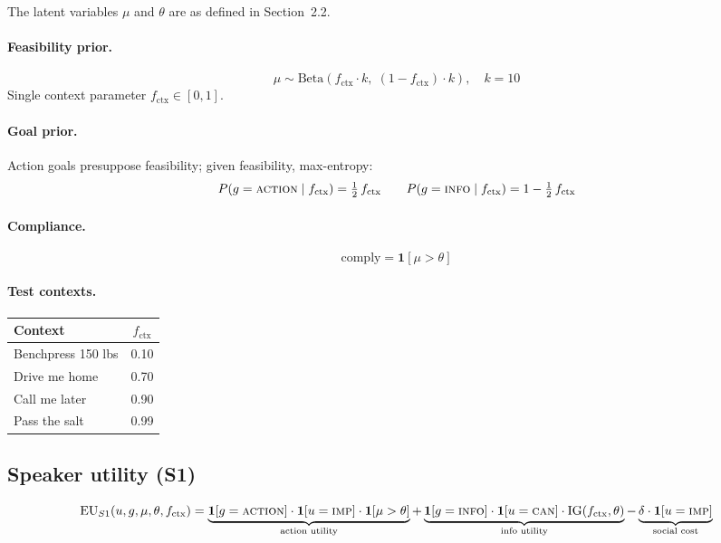 \documentclass[11pt]{article}
\begin{document}
The latent variables $\mu$ and $\theta$ are as defined in Section~2.2.

\paragraph{Feasibility prior.}
\[
  \mu \sim \mathrm{Beta}\!\left(f_{\text{ctx}}\cdot k,\; (1 - f_{\text{ctx}})\cdot k\right), \quad k = 10
\]
Single context parameter $f_{\text{ctx}} \in [0,1]$.

\paragraph{Goal prior.} Action goals presuppose feasibility; given feasibility,
max-entropy:
\[
  P(g = \textsc{action} \mid f_{\text{ctx}}) = \tfrac{1}{2}\,f_{\text{ctx}}
  \qquad
  P(g = \textsc{info} \mid f_{\text{ctx}}) = 1 - \tfrac{1}{2}\,f_{\text{ctx}}
\]

\paragraph{Compliance.}
\[
  \text{comply} = \mathbf{1}[\mu > \theta]
\]

\paragraph{Test contexts.}

\begin{center}
\renewcommand{\arraystretch}{1.2}
\begin{tabular}{lc}
\toprule
\textbf{Context} & $f_{\text{ctx}}$ \\
\midrule
Benchpress 150 lbs & 0.10 \\
Drive me home      & 0.70 \\
Call me later      & 0.90 \\
Pass the salt      & 0.99 \\
\bottomrule
\end{tabular}
\end{center}

\subsection{Speaker utility (S1)}

\[
  \mathrm{EU}_{S1}(u, g, \mu, \theta, f_{\text{ctx}}) =
  \underbrace{\mathbf{1}[g = \textsc{action}]\cdot \mathbf{1}[u = \textsc{imp}]\cdot\mathbf{1}[\mu > \theta]}_{\text{action utility}}
  + \underbrace{\mathbf{1}[g = \textsc{info}]\cdot \mathbf{1}[u = \textsc{can}]\cdot\mathrm{IG}(f_{\text{ctx}}, \theta)}_{\text{info utility}}
  - \underbrace{\delta\cdot\mathbf{1}[u = \textsc{imp}]}_{\text{social cost}}
\]
\end{document}
